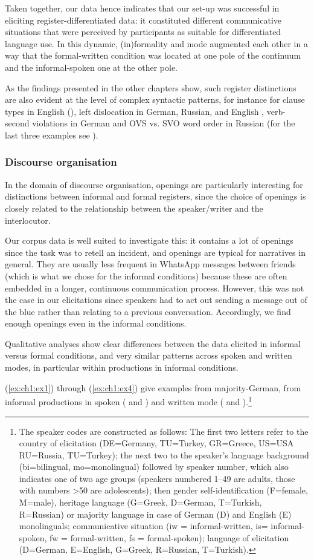 \documentclass[output=paper,colorlinks,citecolor=brown]{langscibook}
\begin{document}
Taken together, our data hence indicates that our set-up was successful in eliciting register-differentiated data: it constituted different communicative situations that were perceived by participants as suitable for differentiated language use. In this dynamic, (in)formality and mode augmented each other in a way that the formal-written condition was located at one pole of the continuum and the informal-spoken one at the other pole.

As the findings presented in the other chapters show, such register distinctions are also evident at the level of complex syntactic patterns, for instance for clause types in English (), left dislocation in German, Russian, and English , verb-second violations in German and OVS vs. SVO word order in Russian (for the last three examples see ).

\subsubsection{Discourse organisation} \label{ch1:sec:3.1.2}
In the domain of discourse organisation, openings are particularly interesting for distinctions between informal and formal registers, since the choice of openings is closely related to the relationship between the speaker/writer and the interlocutor.

Our corpus data is well suited to investigate this: it contains a lot of openings since the task was to retell an incident, and openings are typical for narratives in general. They are usually less frequent in WhatsApp messages between friends (which is what we chose for the informal conditions) because these are often embedded in a longer, continuous communication process. However, this was not the case in our elicitations since speakers had to act out sending a message out of the blue rather than relating to a previous conversation. Accordingly, we find enough openings even in the informal conditions.

Qualitative analyses show clear differences between the data elicited in informal versus formal conditions, and very similar patterns across spoken and written modes, in particular within productions in informal conditions.

(\ref{ex:ch1:ex1}) through (\ref{ex:ch1:ex4}) give examples from majority-German, from informal productions in spoken ( and ) and written mode ( and ).\footnote{The speaker codes are constructed as follows: The first two letters refer to the country of elicitation (DE=Germany, TU=Turkey, GR=Greece, US=USA RU=Russia, TU=Turkey); the next two to the speaker’s language background (bi=bilingual, mo=monolingual) followed by speaker number, which also indicates one of two age groups (speakers numbered 1–49 are adults, those with numbers  >50 are adolescents); then gender self-identification (F=female, M=male), heritage language (G=Greek, D=German, T=Turkish, R=Russian) or majority language in case of German (D) and English (E) monolinguals; communicative situation (iw = informal-written, is= informal-spoken, fw = formal-written, fs = formal-spoken); language of elicitation (D=German, E=English, G=Greek, R=Russian, T=Turkish).}
\end{document}
